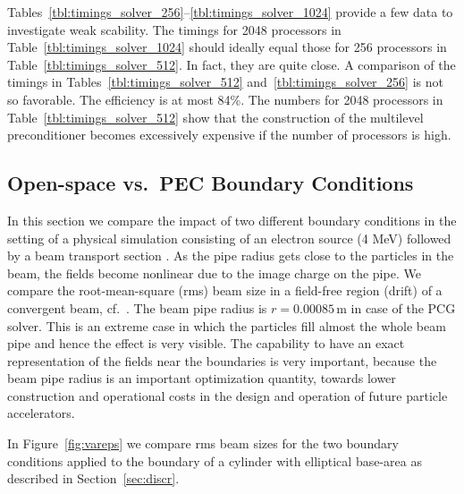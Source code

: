 Tables~\ref{tbl:timings_solver_256}--\ref{tbl:timings_solver_1024}
provide a few data to investigate weak scability.  The timings for 2048
processors in Table~\ref{tbl:timings_solver_1024} should ideally equal
those for 256 processors in Table~\ref{tbl:timings_solver_512}.  In
fact, they are quite close.  A comparison of the timings in
Tables~\ref{tbl:timings_solver_512} and~\ref{tbl:timings_solver_256} is
not so favorable.  The efficiency is at most 84\%.  The numbers for 2048
processors in Table~\ref{tbl:timings_solver_512} show that the
construction of the multilevel preconditioner becomes excessively
expensive if the number of processors is high.

\subsection{Open-space vs.\ PEC Boundary Conditions} 
\label{sec:physrun}

In this section we compare the impact of two different boundary
conditions in the setting of a physical simulation consisting of an
electron source (4 MeV) followed by a beam transport section
\cite{schiet:08}.  As the pipe radius gets close to the particles in the
beam, the fields become nonlinear due to the image charge on the pipe.
We compare the root-mean-square (rms) beam size in a field-free region
(drift) of a convergent beam, cf.~\cite[pp.171ff]{wied:07}.  The beam
pipe radius is $r = 0.00085$\,m in case of the PCG solver.  This is an
extreme case in which the particles fill almost the whole beam pipe and
hence the effect is very visible.  The capability to have an exact
representation of the fields near the boundaries is very important,
because the beam pipe radius is an important optimization quantity,
towards lower construction and operational costs in the design and
operation of future particle accelerators.

In Figure~\ref{fig:vareps} we compare rms beam sizes for the two
boundary conditions applied to the boundary of a cylinder with
elliptical base-area as described in Section~\ref{sec:discr}.


